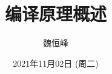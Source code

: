 \documentclass[]{beamer}
\title[编译原理概述]{编译原理概述}
\author[魏恒峰]{\large 魏恒峰}
\institute{hfwei@nju.edu.cn}
\date{2021年11月02日 (周二)}
\begin{document}
\maketitle



\thankyou{}

\end{document}
